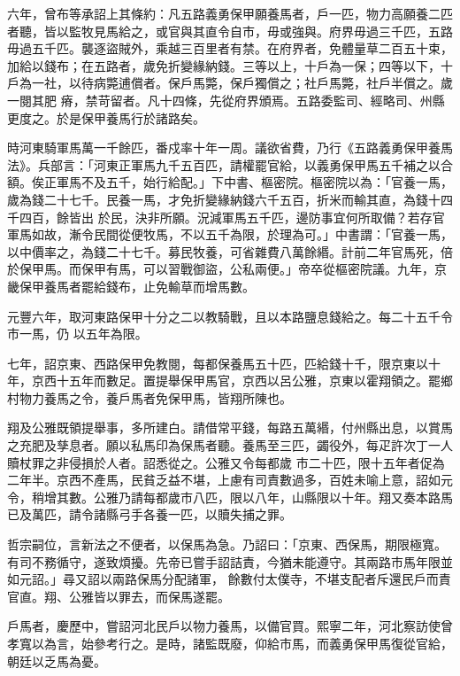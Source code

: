 \begin{pinyinscope}
 六年，曾布等承詔上其條約：凡五路義勇保甲願養馬者，戶一匹，物力高願養二匹者聽，皆以監牧見馬給之，或官與其直令自市，毋或強與。府界毋過三千匹，五路毋過五千匹。襲逐盜賊外，乘越三百里者有禁。在府界者，免體量草二百五十束，加給以錢布；在五路者，歲免折變緣納錢。三等以上，十戶為一保；四等以下，十戶為一社，以待病斃逋償者。保戶馬斃，保戶獨償之；社戶馬斃，社戶半償之。歲一閱其肥
 瘠，禁苛留者。凡十四條，先從府界頒焉。五路委監司、經略司、州縣更度之。於是保甲養馬行於諸路矣。



 時河東騎軍馬萬一千餘匹，番戍率十年一周。議欲省費，乃行《五路義勇保甲養馬法》。兵部言：「河東正軍馬九千五百匹，請權罷官給，以義勇保甲馬五千補之以合額。俟正軍馬不及五千，始行給配。」下中書、樞密院。樞密院以為：「官養一馬，歲為錢二十七千。民養一馬，才免折變緣納錢六千五百，折米而輸其直，為錢十四千四百，餘皆出
 於民，決非所願。況減軍馬五千匹，邊防事宜何所取備？若存官軍馬如故，漸令民間從便牧馬，不以五千為限，於理為可。」中書謂：「官養一馬，以中價率之，為錢二十七千。募民牧養，可省雜費八萬餘緡。計前二年官馬死，倍於保甲馬。而保甲有馬，可以習戰御盜，公私兩便。」帝卒從樞密院議。九年，京畿保甲養馬者罷給錢布，止免輸草而增馬數。



 元豐六年，取河東路保甲十分之二以教騎戰，且以本路鹽息錢給之。每二十五千令市一馬，仍
 以五年為限。



 七年，詔京東、西路保甲免教閱，每都保養馬五十匹，匹給錢十千，限京東以十年，京西十五年而數足。置提舉保甲馬官，京西以呂公雅，京東以霍翔領之。罷鄉村物力養馬之令，養戶馬者免保甲馬，皆翔所陳也。



 翔及公雅既領提舉事，多所建白。請借常平錢，每路五萬緡，付州縣出息，以賞馬之充肥及孳息者。願以私馬印為保馬者聽。養馬至三匹，蠲役外，每疋許次丁一人贖杖罪之非侵損於人者。詔悉從之。公雅又令每都歲
 市二十匹，限十五年者促為二年半。京西不產馬，民貧乏益不堪，上慮有司責數過多，百姓未喻上意，詔如元令，稍增其數。公雅乃請每都歲市八匹，限以八年，山縣限以十年。翔又奏本路馬已及萬匹，請令諸縣弓手各養一匹，以贖失捕之罪。



 哲宗嗣位，言新法之不便者，以保馬為急。乃詔曰：「京東、西保馬，期限極寬。有司不務循守，遂致煩擾。先帝已嘗手詔詰責，今猶未能遵守。其兩路市馬年限並如元詔。」尋又詔以兩路保馬分配諸軍，
 餘數付太僕寺，不堪支配者斥還民戶而責官直。翔、公雅皆以罪去，而保馬遂罷。



 戶馬者，慶歷中，嘗詔河北民戶以物力養馬，以備官買。熙寧二年，河北察訪使曾孝寬以為言，始參考行之。是時，諸監既廢，仰給市馬，而義勇保甲馬復從官給，朝廷以乏馬為憂。




\end{pinyinscope}
